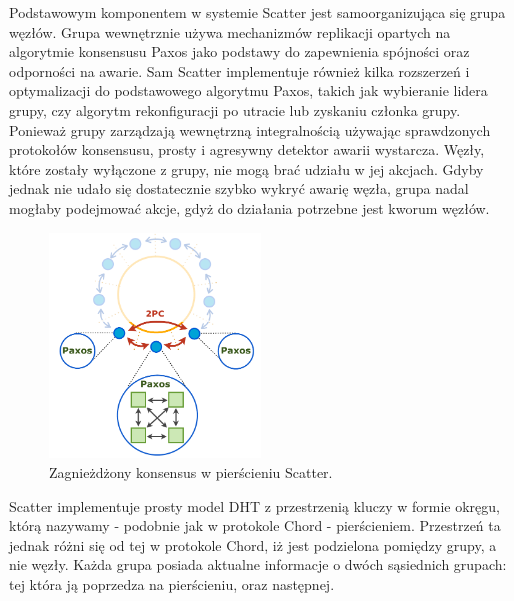 \documentclass[12pt, twoside, openany]{report}
\begin{document}
Podstawowym komponentem w systemie Scatter jest samoorganizująca się grupa węzłów. Grupa wewnętrznie używa mechanizmów replikacji opartych na algorytmie konsensusu Paxos jako podstawy do zapewnienia spójności oraz odporności na awarie. Sam Scatter implementuje również kilka rozszerzeń i optymalizacji do podstawowego algorytmu Paxos, takich jak wybieranie lidera grupy, czy algorytm rekonfiguracji po utracie lub zyskaniu członka grupy.
Ponieważ grupy zarządzają wewnętrzną integralnością używając sprawdzonych protokołów konsensusu, prosty i agresywny detektor awarii wystarcza. Węzły, które zostały wyłączone z grupy, nie mogą brać udziału w jej akcjach. Gdyby jednak nie udało się dostatecznie szybko wykryć awarię węzła, grupa nadal mogłaby podejmować akcje, gdyż do działania potrzebne jest kworum węzłów.

\begin{figure}[H]
\centering
\includegraphics[width=0.5\textwidth,height=\textheight,keepaspectratio]{scatter.png}
\caption{Zagnieżdżony konsensus w pierścieniu Scatter.}
\label{fig:scatter}
\end{figure}

Scatter implementuje prosty model DHT z przestrzenią kluczy w formie okręgu, którą nazywamy - podobnie jak w protokole Chord - pierścieniem. Przestrzeń ta jednak różni się od tej w protokole Chord, iż jest podzielona pomiędzy grupy, a nie węzły. Każda grupa posiada aktualne informacje o dwóch sąsiednich grupach: tej która ją poprzedza na pierścieniu, oraz następnej.
\end{document}
